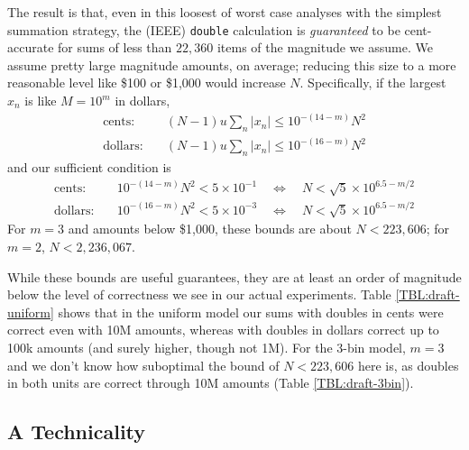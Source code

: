 \documentclass[11pt, oneside]{amsart}   	%
\begin{document}
The result is that, even in this loosest of worst case analyses with the simplest summation strategy, the (IEEE) \texttt{double} calculation is {\em guaranteed} to be cent-accurate for sums of less than $22,360$ items of the magnitude we assume. We assume pretty large magnitude amounts, on average; reducing this size to a more reasonable level like \$100 or \$1,000 would increase $N$. Specifically, if the largest $x_n$ is like $M = 10^m$ in dollars, 
\begin{align*}
    \text{cents: }\quad
        &(N-1)u \sum_n | x_n | 
        \leq 10^{-(14-m)} N^2
         \\
    \text{dollars:}\quad
        &(N-1)u \sum_n | x_n | 
        \leq 10^{-(16-m)} N^2
\end{align*}
and our sufficient condition is
\begin{align*}
    \text{cents: }\quad
        &10^{-(14-m)} N^2 < 5\times10^{-1}
        \quad\iff\quad
        N < \sqrt{5}\times10^{6.5-m/2}
         \\
    \text{dollars:}\quad
        &10^{-(16-m)} N^2 < 5\times10^{-3}
        \quad\iff\quad
        N < \sqrt{5}\times10^{6.5-m/2}
\end{align*}
For $m = 3$ and amounts below \$1,000, these bounds are about $N < 223,606$; for $m = 2$, $N < 2,236,067$. 

While these bounds are useful guarantees, they are at least an order of magnitude below the level of correctness we see in our actual experiments. Table \ref{TBL:draft-uniform} shows that in the uniform model our sums with doubles in cents were correct even with 10M amounts, whereas with doubles in dollars correct up to 100k amounts (and surely higher, though not 1M). For the 3-bin model, $m = 3$ and we don't know how suboptimal the bound of $N < 223,606$ here is, as doubles in both units are correct through 10M amounts (Table \ref{TBL:draft-3bin}). 

\subsection{A Technicality}
\end{document}
